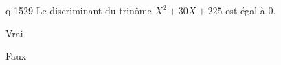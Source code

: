 \begin{truefalse}{q-1529}
Le discriminant du trinôme $X^2+30X+225$ est égal à $0$.
\item* Vrai
\item Faux
\end{truefalse}

